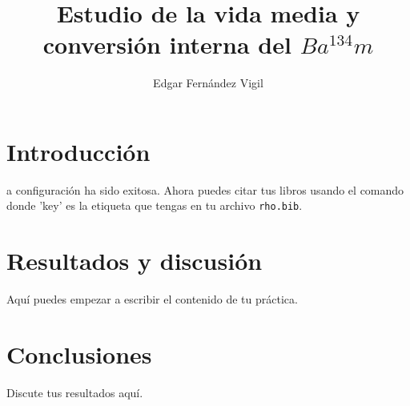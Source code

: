 \documentclass[9pt,a4paper,twocolumn,twoside]{rho-class/rho}
\title{Estudio de la vida media y conversión interna del $Ba^{134} m$}
\author{Edgar Fernández Vigil}
\affil{Física - Facultad de Ciencias - Universidad de Oviedo}
\begin{document}
    \maketitle
    \thispagestyle{firststyle}

\section{Introducción}
    a configuración ha sido exitosa. Ahora puedes citar 
    tus libros usando el comando \cite{PFGPlots} donde 'key' es la 
    etiqueta que tengas en tu archivo \texttt{rho.bib}.

\section{Resultados y discusión}
    Aquí puedes empezar a escribir el contenido de tu práctica.

\section{Conclusiones}
    Discute tus resultados aquí.

\newpage

\printbibliography
\end{document}
